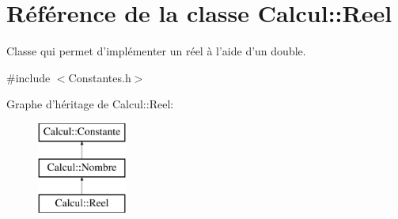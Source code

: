 \hypertarget{class_calcul_1_1_reel}{\section{Référence de la classe Calcul\-:\-:Reel}
\label{class_calcul_1_1_reel}
}


Classe qui permet d'implémenter un réel à l'aide d'un double.  




{\ttfamily \#include $<$Constantes.\-h$>$}

Graphe d'héritage de Calcul\-:\-:Reel\-:\begin{figure}[H]
\begin{center}
\leavevmode
\includegraphics[height=3.000000cm]{class_calcul_1_1_reel}
\end{center}
\end{figure}
